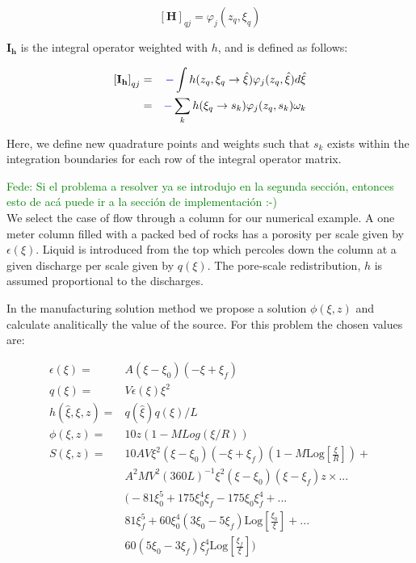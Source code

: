 \documentclass{CFD2011}
\newcommand{\Fede}[1]{\textcolor{green}{Fede: #1} \\}
\newcommand{\Pablo}[1]{\textcolor{blue}{#1}}
\begin{document}
\begin{equation}
\left[\mathbf{H}\right]_{qj}=\varphi_j(z_q,\xi_q)
\end{equation}

$\mathbf{I_h}$ is the integral operator weighted with $h$, and is defined as follows:

\begin{eqnarray}
\left[\mathbf{I_h}\right]_{qj}&=& \Pablo{-} \int h(z_q,\xi_q\rightarrow\hat{\xi})\varphi_j(z_q,\hat{\xi}) d\hat{\xi}\nonumber \\
&=& \Pablo{-} \sum_k h(\xi_q\rightarrow s_k )\varphi_j(z_q,s_k) \omega_k
\end{eqnarray}

Here, we define new quadrature points and weights such that $s_k$ exists within the integration boundaries for each row of the integral operator matrix. 

\Fede{Si el problema a resolver ya se introdujo en la segunda secci\'on, entonces esto de ac\'a puede ir a la secci\'on de implementaci\'on :-)}


We select the case of flow through a column for our numerical example. A one meter column filled with a packed bed of rocks has a porosity per scale given by $\epsilon({\xi})$. Liquid is introduced from the top which percoles down the column at a given discharge per scale given by $q({\xi})$. The pore-scale redistribution, $h$  is assumed proportional to the discharges.

In the manufacturing solution method we propose a solution $\phi(\xi, z)$ and calculate analitically the value of the source. For this problem the chosen values are:

\begin{align}
\epsilon(\xi)=&A (\xi-\xi_0) (-\xi+\xi_f) \\
q({\xi}) =&V \epsilon(\xi) \xi^2\\
h(\hat \xi, \xi, z) =& q(\hat \xi) q(\xi)/L\\
\phi(\xi, z) =& 10 z (1-M Log({\xi}/R))\\
\nonumber S(\xi, z)=& 10 A V {\xi}^2 ({\xi}-\xi_0) (-{\xi}+\xi_f) \left(1-M \text{Log}\left[\frac{{\xi}}{R}\right]\right) +\\
\nonumber  &A^2 M V^2  (360 L)^{-1} {\xi}^2 ({\xi}-\xi_0) ({\xi}-\xi_f) z \times ... \\
\nonumber  &\big(-81 \xi_0^5+175 \xi_0^4 \xi_f-175 \xi_0 \xi_f^4+  ...\\
\nonumber &81 \xi_f^5+60 \xi_0^4 (3 \xi_0-5 \xi_f) \text{Log}\left[\frac{\xi_0}{{\xi}}\right]+ ...\\
& 60 (5 \xi_0-3 \xi_f) \xi_f^4 \text{Log}\left[\frac{\xi_f}{{\xi}}\right]\big)
\end{align}
\end{document}
